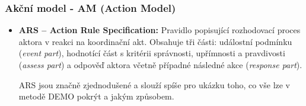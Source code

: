 
\subsubsection{Akční model - AM (Action Model)}
\label{sec:demo-am}

\begin{itemize}
  \item \textbf{ARS – Action Rule Specification:} Pravidlo popisující rozhodovací proces aktora v reakci na koordinační akt. Obsahuje tři části: událostní podmínku (\emph{event part}), hodnotící část s kritérii správnosti, upřímnosti a pravdivosti (\emph{assess part}) a odpověď aktora včetně případné následné akce (\emph{response part}).
  
  ARS jsou značně zjednodušené a slouží spíše pro ukázku toho, co vše lze v metodě DEMO pokrýt a jakým způsobem.  
  

\end{itemize}
